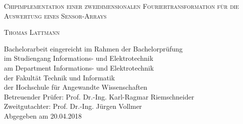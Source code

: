 \begin{titlepage}
 \begin{center}

{\scshape\Large Chipimplementation einer zweidimensionalen Fouriertransformation für die Auswertung eines
Sensor-Arrays}

\vspace{1cm}

{\scshape\Large Thomas Lattmann}

\end{center}

\vfill

\noindent Bachelorarbeit eingereicht im Rahmen der Bachelorprüfung\\ 
im Studiengang Informations- und Elektrotechnik\\
am Department Informations- und Elektrotechnik\\
der Fakultät Technik und Informatik\\
der Hochschule für Angewandte Wissenschaften\\

\vspace{0.5cm}
\noindent Betreuender Prüfer: Prof. Dr.-Ing. Karl-Ragmar Riemschneider\\
Zweitgutachter: Prof. Dr.-Ing. Jürgen Vollmer\\

\vspace{0.5cm}
\noindent Abgegeben am 20.04.2018

\addtocounter{page}{-1}

\end{titlepage}
 \restoregeometry